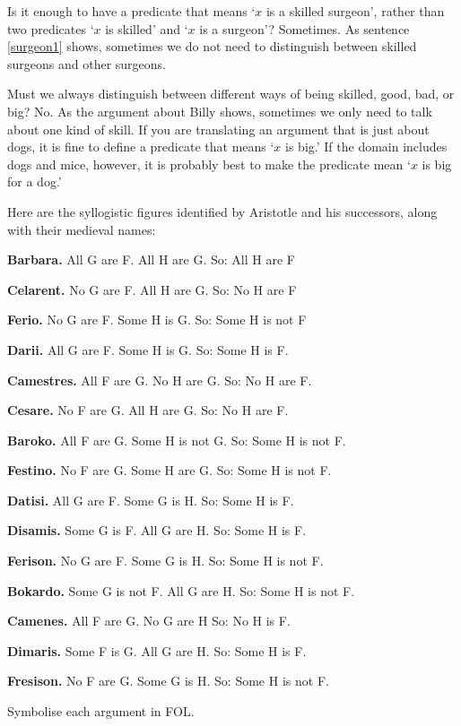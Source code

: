 Is it enough to have a predicate that means `$x$ is a skilled surgeon', rather than two predicates `$x$ is skilled' and `$x$ is a surgeon'? Sometimes. As sentence \ref{surgeon1} shows, sometimes we do not need to distinguish between skilled surgeons and other surgeons.

Must we always distinguish between different ways of being skilled, good, bad, or big? No. As the argument about Billy shows, sometimes we only need to talk about one kind of skill. If you are translating an argument that is just about dogs, it is fine to define a predicate that means `$x$ is big.' If the domain includes dogs and mice, however, it is probably best to make the predicate mean `$x$ is big for a dog.'

\practiceproblems
\problempart
\label{pr.BarbaraEtc}
Here are the syllogistic figures identified by Aristotle and his successors, along with their medieval names:
\begin{ebullet}
	\item \textbf{Barbara.} All G are F. All H are G. So:  All H are F
	\item \textbf{Celarent.} No G are F. All H are G. So: No H are F
	\item \textbf{Ferio.} No G are F. Some H is G. So: Some H is not F
	\item \textbf{Darii.} All G are F. Some H is G. So: Some H is F.
	\item \textbf{Camestres.} All F are G. No H are G. So: No H are F.
	\item \textbf{Cesare.} No F are G. All H are G. So: No H are F.
	\item \textbf{Baroko.} All F are G. Some H is not G. So: Some H is not F.
	\item \textbf{Festino.} No F are G. Some H are G. So: Some H is not F.
	\item \textbf{Datisi.} All G are F. Some G is H. So: Some H is F.
	\item \textbf{Disamis.} Some G is F. All G are H. So: Some H is F.
	\item \textbf{Ferison.} No G are F. Some G is H. So: Some H is not F.
	\item \textbf{Bokardo.} Some G is not F. All G are H. So:  Some H is not F.
	\item \textbf{Camenes.} All F are G. No G are H So: No H is F.
	\item \textbf{Dimaris.} Some F is G. All G are H. So: Some H is F.
	\item \textbf{Fresison.} No F are G. Some G is H. So: Some H is not F.
\end{ebullet}
Symbolise each argument in FOL.

